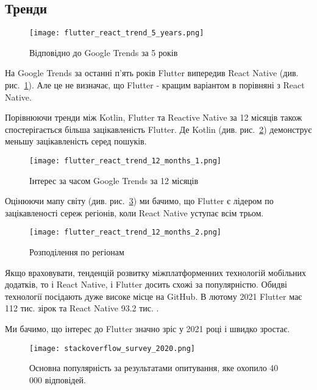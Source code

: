 \subsection{Тренди}
\label{subsec:mobile_trends}

\begin{figure}
    \texttt{[image: flutter\_react\_trend\_5\_years.png]}
    \caption{Відповідно до Google Trends за 5 років}
    \label{fig:flutter_react_trend_5_years}
\end{figure}

На Google Trends за останні п’ять років Flutter випередив React Native (див. рис.~\ref{fig:flutter_react_trend_5_years}).
Але це не визначає, що Flutter - кращим варіантом в порівняні з React Native.

Порівнюючи тренди між Kotlin, Flutter та Reactive Native за 12 місяців також спостерігається більша зацікавленість Flutter.
Де Kotlin (див. рис.~\ref{fig:flutter_react_trend_12_months_1}) демонструє меньшу зацікавленість серед пошуків.
\begin{figure}
    \texttt{[image: flutter\_react\_trend\_12\_months\_1.png]}
    \caption{Інтерес за часом Google Trends за 12 місяців \cite{google_trends}}
    \label{fig:flutter_react_trend_12_months_1}
\end{figure}

Оцінюючи мапу світу (див. рис.~\ref{fig:flutter_react_trend_12_months_2}) ми бачимо, що Flutter є лідером по зацікавленості сереж регіонів, коли React Native уступає всім трьом.
\begin{figure}
    \texttt{[image: flutter\_react\_trend\_12\_months\_2.png]}
    \caption{Розподілення по регіонам \cite{google_trends}}
    \label{fig:flutter_react_trend_12_months_2}
\end{figure}

Якщо враховувати, тенденцій розвитку міжплатформенних технологій мобільних додатків, то і React Native, і Flutter досить схожі за популярністю.
Обидві технології посідають дуже високе місце на GitHub.
В лютому 2021 Flutter має 112 тис. зірок \cite{flutter_gihtub} та React Native 93.2 тис. \cite{rn_gihtub}.

Ми бачимо, що інтерес до Flutter значно зріс у 2021 році і швидко зростає.

\begin{figure}
    \begin{center}
        \texttt{[image: stackoverflow\_survey\_2020.png]}
    \end{center}
    \caption{Основна популярність за результатами опитування, яке охопило 40 000 відповідей. \cite{stackoverflow_survey_2020}}
    \label{fig:stackoverflow_survey_2020}
\end{figure}

